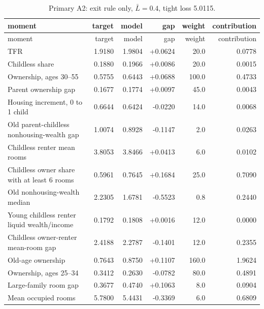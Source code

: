 \documentclass[10pt]{article}
\begin{document}
\begin{longtable}{p{}rrrrr}
\caption{Primary A2: exit rule only, $\bar L=0.4$, tight loss 5.0115.}
\label{tab:a2fit}\\
\toprule
moment & target & model & gap & weight & contribution \\
\midrule
\endfirsthead
\toprule
moment & target & model & gap & weight & contribution \\
\midrule
\endhead
TFR & 1.9180 & 1.9804 & +0.0624 & 20.0 & 0.0778 \\
Childless share & 0.1880 & 0.1966 & +0.0086 & 20.0 & 0.0015 \\
Ownership, ages 30--55 & 0.5755 & 0.6443 & +0.0688 & 100.0 & 0.4733 \\
Parent ownership gap & 0.1677 & 0.1774 & +0.0097 & 45.0 & 0.0043 \\
Housing increment, 0 to 1 child & 0.6644 & 0.6424 & -0.0220 & 14.0 & 0.0068 \\
Old parent-childless nonhousing-wealth gap & 1.0074 & 0.8928 & -0.1147 & 2.0 & 0.0263 \\
Childless renter mean rooms & 3.8053 & 3.8466 & +0.0413 & 6.0 & 0.0102 \\
Childless owner share with at least 6 rooms & 0.5961 & 0.7645 & +0.1684 & 25.0 & 0.7090 \\
Old nonhousing-wealth median & 2.2305 & 1.6781 & -0.5523 & 0.8 & 0.2440 \\
Young childless renter liquid wealth/income & 0.1792 & 0.1808 & +0.0016 & 12.0 & 0.0000 \\
Childless owner-renter mean-room gap & 2.4188 & 2.2787 & -0.1401 & 12.0 & 0.2355 \\
Old-age ownership & 0.7643 & 0.8750 & +0.1107 & 160.0 & 1.9624 \\
Ownership, ages 25--34 & 0.3412 & 0.2630 & -0.0782 & 80.0 & 0.4891 \\
Large-family room gap & 0.3677 & 0.4740 & +0.1063 & 8.0 & 0.0904 \\
Mean occupied rooms & 5.7800 & 5.4431 & -0.3369 & 6.0 & 0.6809 \\
\bottomrule
\end{longtable}
\end{document}

